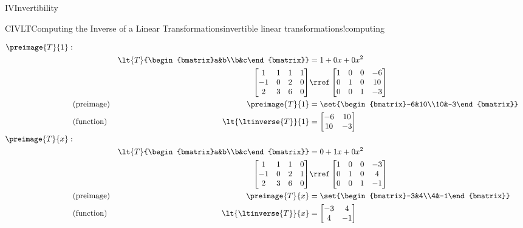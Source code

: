 \begin{subsect}{IV}{Invertibility}
\begin{example}{CIVLT}{Computing the Inverse of a Linear Transformations}{invertible linear transformations!computing}
\begin{para}
%
\begin{align*}
\preimage{T}{1}:&\\
&&\lt{T}{\begin{bmatrix}a&b\\b&c\end{bmatrix}}
&=1+0x+0x^2\\
%
&&\begin{bmatrix}
 1 & 1 & 1 & 1\\
 -1 & 0 & 2 & 0\\
 2 & 3 & 6 & 0
\end{bmatrix}
&\rref
\begin{bmatrix}
1 & 0 & 0& -6 \\
0 & 1 & 0& 10 \\
0 & 0 & 1& -3
\end{bmatrix}
\\
&\text{(preimage)}&\preimage{T}{1}
&=\set{\begin{bmatrix}-6&10\\10&-3\end{bmatrix}}\\
%
&\text{(function)}&\lt{\ltinverse{T}}{1}
&=
\begin{bmatrix}-6&10\\10&-3\end{bmatrix}\\
%
%
\preimage{T}{x}:&\\
&&\lt{T}{\begin{bmatrix}a&b\\b&c\end{bmatrix}}
&=0+1x+0x^2\\
%
&&\begin{bmatrix}
 1 & 1 & 1 & 0\\
 -1 & 0 & 2 & 1\\
 2 & 3 & 6 & 0
\end{bmatrix}
&\rref
\begin{bmatrix}
1 & 0 & 0& -3 \\
0 & 1 & 0& 4 \\
0 & 0 & 1&  -1
\end{bmatrix}
\\
&\text{(preimage)}&\preimage{T}{x}
&=\set{\begin{bmatrix}-3&4\\4&-1\end{bmatrix}}\\
%
&\text{(function)}&\lt{\ltinverse{T}}{x}
&=
\begin{bmatrix}-3&4\\4&-1\end{bmatrix}\\

\end{align*}
\end{para}
\end{example}
\end{subsect}
